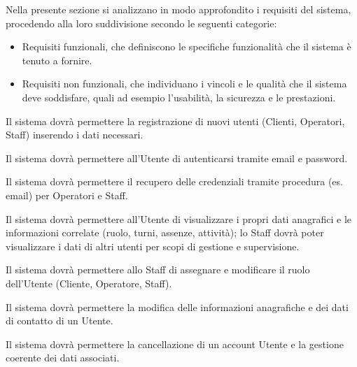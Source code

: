 \documentclass[a4paper]{report}
\begin{document}

Nella presente sezione si analizzano in modo approfondito i requisiti del sistema, procedendo alla loro suddivisione secondo le seguenti categorie:
\begin{itemize}
    \item Requisiti funzionali, che definiscono le specifiche funzionalità che il sistema è tenuto a fornire.
    \item Requisiti non funzionali, che individuano i vincoli e le qualità che il sistema deve soddisfare, quali ad esempio l'usabilità, la sicurezza e le prestazioni.
\end{itemize}




Il sistema dovrà permettere la registrazione di nuovi utenti (Clienti, Operatori, Staff) inserendo i dati necessari.


Il sistema dovrà permettere all’Utente di autenticarsi tramite email e password.


Il sistema dovrà permettere il recupero delle credenziali tramite procedura (es. email) per Operatori e Staff.


Il sistema dovrà permettere all'Utente di visualizzare i propri dati anagrafici e le informazioni correlate (ruolo, turni, assenze, attività); lo Staff dovrà poter visualizzare i dati di altri utenti per scopi di gestione e supervisione.


Il sistema dovrà permettere allo Staff di assegnare e modificare il ruolo dell'Utente (Cliente, Operatore, Staff).


Il sistema dovrà permettere la modifica delle informazioni anagrafiche e dei dati di contatto di un Utente.


Il sistema dovrà permettere la cancellazione di un account Utente e la gestione coerente dei dati associati.
\end{document}
